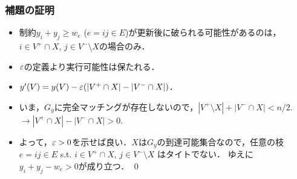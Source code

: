 \documentclass[14pt,aspectratio=169,xcolor=dvipsnames,table,onlytextwidth,dvipdfmx]{beamer}
\begin{document}
\begin{frame}
    \frametitle{補題の証明}

    \small
    
    \begin{itemize}
        \item 制約$y_i + y_j \geq w_e$ ($e = ij \in E$)が更新後に破られる可能性があるのは，$i \in V^+ \cap X$, $j \in V^- \setminus X$の場合のみ．
        \item $\varepsilon$の定義より実行可能性は保たれる．
    \end{itemize}

    \bigskip\pause
    \begin{itemize}
        \item $y'(V) = y(V) - \varepsilon(|V^+ \cap X| - |V^- \cap X|)$．
        
        \item いま，$G_y$に完全マッチングが存在しないので，$|V^+ \setminus X| + |V^- \cap X| < n/2$. \\
        $\longrightarrow |V^+ \cap X| - |V^- \cap X| > 0$.
        
        \item よって，$\varepsilon > 0$を示せば良い．$X$は$G_y$の到達可能集合なので，任意の枝$e = ij \in E$ s.t. $i \in V^+ \cap X$, $j \in V^- \setminus X$ はタイトでない．
        ゆえに$y_i + y_j - w_e > 0$が成り立つ． \qed
    \end{itemize}
    
\end{frame}
\end{document}
